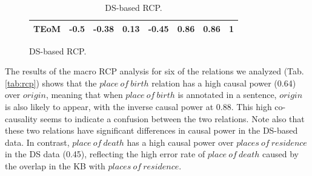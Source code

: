 \begin{table}[htb!]
\begin{subfigure}{\textwidth}
{\begin{tabular}{rccccccc}
     TEoM & -0.5  & -0.38 & 0.13  & -0.45 & 0.86  & \textbf{0.86}  & 1 \\ %
     \bottomrule
    \end{tabular}
    }
\end{subfigure}
\begin{subfigure}{\textwidth}
	\caption{DS-based RCP.}
    \label{tab:ds_rcp}
    \centering
\end{subfigure}
\end{table}

The results of the macro RCP analysis for six of the relations we analyzed (Tab.\ref{tab:rcp}) shows that the $place\ of\ birth$ relation has a high causal power (0.64) over $origin$, meaning that when $place\ of\ birth$ is annotated in a sentence, $origin$ is also likely to appear, with the inverse causal power at 0.88.  This high co-causality seems to indicate a confusion between the two relations. Note also that these two relations have significant differences in causal power in the DS-based data. In contrast, $place\ of\ death$ has a high causal power over $places\ of\ residence$ in the DS data (0.45), reflecting the high error rate of $place\ of\ death$ caused by the overlap in the KB with $places\ of\ residence$.

